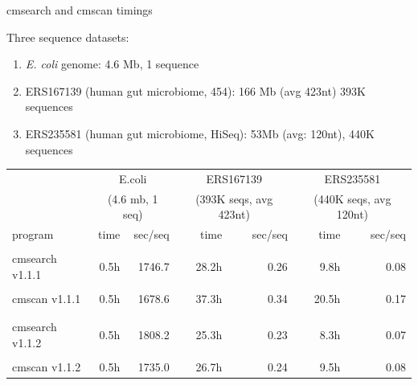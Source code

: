 \documentclass[landscape]{slides}
\begin{document}
\begin{slide}
\begin{center}
cmsearch and cmscan timings
\end{center}
\medskip

\small

Three sequence datasets:
\begin{enumerate}
  \item \emph{E. coli} genome: 4.6 Mb, 1 sequence
  \item ERS167139 (human gut microbiome, 454): 166 Mb (avg 423nt) 393K sequences 
  \item ERS235581 (human gut microbiome, HiSeq): 53Mb (avg: 120nt), 440K sequences
\end{enumerate}

\begin{center}

\medskip
\medskip

\begin{tabular}{l|r|r||r|r||r|r||}
         & \multicolumn{2}{c||}{E.coli}  & \multicolumn{2}{c||}{ERS167139} & \multicolumn{2}{c||}{ERS235581} \\
         & \multicolumn{2}{c||}{(4.6 mb, 1 seq)}  & \multicolumn{2}{c||}{(393K seqs, avg 423nt)} & \multicolumn{2}{c||}{(440K seqs, avg 120nt)} \\ \hline
program  & time & sec/seq & time & sec/seq & time & sec/seq \\ \hline
         &      &  & & & & \\
cmsearch v1.1.1  &     0.5h& 1746.7  & 28.2h   & 0.26    & 9.8h    & 0.08 \\
         &      &  & & & & \\
cmscan v1.1.1   &     0.5h& 1678.6  & 37.3h   & 0.34    & 20.5h   & 0.17 \\
         &      &  & & & & \\ \hline
         &      &  & & & & \\ 
cmsearch v1.1.2  &     0.5h& 1808.2  & 25.3h   & 0.23    & 8.3h    & 0.07 \\
         &      &  & & & & \\
cmscan v1.1.2   &     0.5h& 1735.0  & \textcolor{coltwooftwo}{26.7h}   & \textcolor{coltwooftwo}{0.24}    & \textcolor{coltwooftwo}{9.5h}   & \textcolor{coltwooftwo}{0.08} \\
\end{tabular}

\end{center}
\vfill
\end{slide}
\end{document}

